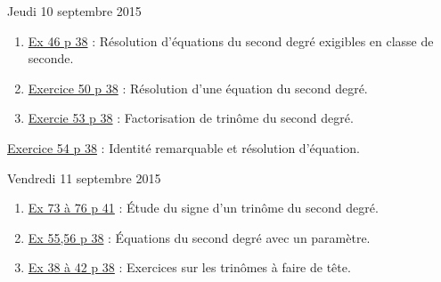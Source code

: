 \documentclass[a4paper,11pt]{article}
\theoremstyle{break}
\begin{document}
  Jeudi 10 septembre 2015
  \begin{enumerate}   
    \item  
    \href{https://github.com/mathlorgues/math1sd1516/blob/master/images/46p38.jpg}
    {Ex 46 p 38} : Résolution d'équations du second degré exigibles en classe de seconde.
    
    \item 
    \href{https://github.com/mathlorgues/math1sd1516/blob/master/20150907/46p38.jpg}
    {Exercice 50 p 38} : Résolution d'une équation du second degré.
    \item 
    \href{https://github.com/mathlorgues/math1sd1516/blob/master/images/53-54p38.png}
    {Exercie 53 p 38} : Factorisation de trinôme du second degré.
    
  \end{enumerate}
  
  \begin{Dev}  
    \href{https://github.com/mathlorgues/math1sd1516/blob/master/images/53-54p38.png}
    {Exercice 54 p 38} : Identité remarquable et résolution d'équation.
  \end{Dev}
  
  Vendredi 11 septembre 2015
  
  \begin{enumerate}
    
    \item
    \href{https://github.com/mathlorgues/math1sd1516/blob/master/images/73-76p41.png}
    {Ex 73 à 76 p 41} : \'Etude du signe d'un trinôme du second degré.
    
    \item 
    \href{https://github.com/mathlorgues/math1sd1516/blob/master/images/55-56p38.png}
    {Ex 55,56 p 38} : \'Equations du second degré avec un paramètre.
    
    \item
    \href{https://github.com/mathlorgues/math1sd1516/blob/master/20150907/38-42p38.jpg}
    {Ex 38 à 42 p 38} : Exercices sur les trinômes à faire de tête.
    
  \end{enumerate}
  
\end{document}
